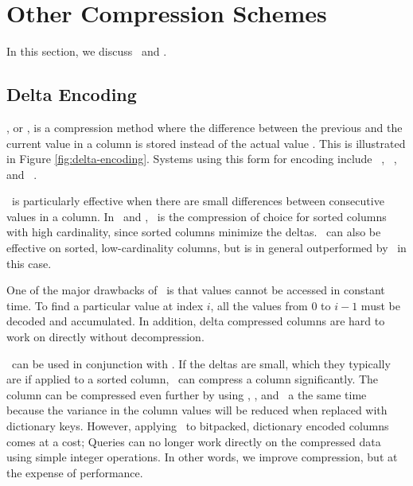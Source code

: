 \section{Other Compression Schemes}
\label{sec:Other Compression Schemes}
In this section, we discuss \dele~and \rle.

\subsection{Delta Encoding}
\label{sub:Delta Encoding}


\dele, or , is a compression method where the difference between the previous and the current value in a column is stored instead of the actual value \cite{Wikipedia_contributors2015-cb}. This is illustrated in Figure \ref{fig:delta-encoding}.  Systems using this form for encoding include \vertica~\cite{Lamb2012-kg}, \cstore~\cite{Stonebraker2005-qz}, and \blink~\cite{Raman2008-gi}. 

\dele~is particularly effective when there are small differences between consecutive values in a column. In \cstore~and \vertica, \dele~is the compression of choice for sorted columns with high cardinality, since sorted columns minimize the deltas. \dele~can also be effective on sorted, low-cardinality columns, but is in general outperformed by \rle~in this case.

One of the major drawbacks of \dele~is that values cannot be accessed in constant time. To find a particular value at index $i$, all the values from $0$ to $i - 1$ must be decoded and accumulated. In addition, delta compressed columns are hard to work on directly without decompression.

\bp~can be used in conjunction with \dele. If the deltas are small, which they typically are if applied to a sorted column, \bp~can compress a column significantly. The column can be compressed even further by using \de, \dele, and \bp~a the same time because the variance in the column values will be reduced when replaced with dictionary keys. However, applying \dele~to bitpacked, dictionary encoded columns comes at a cost; Queries can no longer work directly on the compressed data using simple integer operations. In other words, we improve compression, but at the expense of performance.

